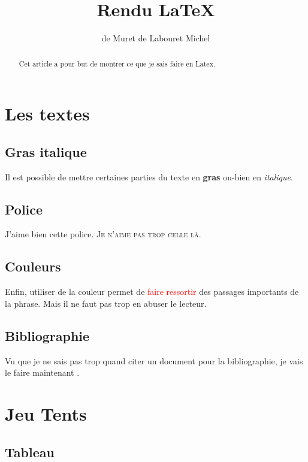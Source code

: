 \documentclass[12pt]{article}
\title{Rendu \LaTeX}
\author{de Muret de Labouret Michel}
\let\LaTeXStandardSubsection\subsection
\renewcommand{\subsection}[1]{\filbreak\LaTeXStandardSubsection{#1}}
\begin{document}
\maketitle

\begin{abstract}
Cet article a pour but de montrer ce que je sais faire en Latex.
\end{abstract}

\newpage

\tableofcontents

\newpage

\filbreak
\section{Les textes}

\subsection{Gras italique}
Il est possible de mettre certaines parties du texte en \textbf{gras} ou-bien en \textit{italique}.

\subsection{Police}
\textsf{J'aime bien cette police.}
\textsc{Je n'aime pas trop celle là.}

\subsection{Couleurs}
Enfin, utiliser de la couleur permet de \textcolor{red}{faire ressortir} des passages importants de la phrase. Mais il 
ne faut pas trop en abuser     le lecteur.

\subsection{Bibliographie}
Vu que je ne sais pas trop quand citer un document pour la bibliographie, je vais le faire maintenant \cite{preparata-1988}.


\filbreak
\section{Jeu Tents}

\subsection{Tableau}
\label{Tableau}
\end{document}
